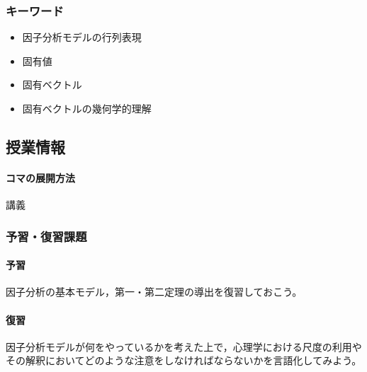 \subsubsection{キーワード}
\begin{itemize}
\item 因子分析モデルの行列表現
\item 固有値
\item 固有ベクトル
\item 固有ベクトルの幾何学的理解
\end{itemize}
\subsection{授業情報}
\paragraph{コマの展開方法}
講義
\subsubsection{予習・復習課題}
\paragraph{予習}因子分析の基本モデル，第一・第二定理の導出を復習しておこう。
\paragraph{復習}因子分析モデルが何をやっているかを考えた上で，心理学における尺度の利用やその解釈においてどのような注意をしなければならないかを言語化してみよう。
